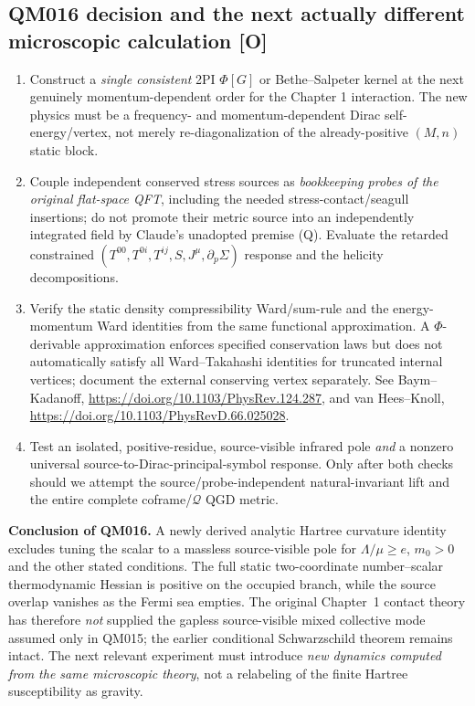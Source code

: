 \documentclass[11pt,a4paper]{article}
\begin{document}
\subsection{QM016 decision and the next actually different microscopic calculation [O]}\label{sec:v10-decision}
\begin{enumerate}[label=\textbf{QM017-\arabic*.},leftmargin=18mm,itemsep=3pt]
\item Construct a \emph{single consistent} 2PI $\Phi[G]$ or Bethe--Salpeter kernel at the next genuinely momentum-dependent order for the Chapter 1 interaction. The new physics must be a frequency- and momentum-dependent Dirac self-energy/vertex, not merely re-diagonalization of the already-positive $(M,n)$ static block.
\item Couple independent conserved stress sources as \emph{bookkeeping probes of the original flat-space QFT}, including the needed stress-contact/seagull insertions; do not promote their metric source into an independently integrated field by Claude's unadopted premise (Q). Evaluate the retarded constrained $(T^{00},T^{0i},T^{ij},S,J^\mu,\partial_p\Sigma)$ response and the helicity decompositions.
\item Verify the static density compressibility Ward/sum-rule and the energy-momentum Ward identities from the same functional approximation. A $\Phi$-derivable approximation enforces specified conservation laws but does not automatically satisfy all Ward--Takahashi identities for truncated internal vertices; document the external conserving vertex separately. See Baym--Kadanoff, \url{https://doi.org/10.1103/PhysRev.124.287}, and van Hees--Knoll, \url{https://doi.org/10.1103/PhysRevD.66.025028}.
\item Test an isolated, positive-residue, source-visible infrared pole \emph{and} a nonzero universal source-to-Dirac-principal-symbol response. Only after both checks should we attempt the source/probe-independent natural-invariant lift and the entire complete coframe/$\mathcal Q$ QGD metric.
\end{enumerate}
\textbf{Conclusion of QM016.} A newly derived analytic Hartree curvature identity excludes tuning the scalar to a massless source-visible pole for $\Lambda/\mu\ge e$, $m_0>0$ and the other stated conditions. The full static two-coordinate number--scalar thermodynamic Hessian is positive on the occupied branch, while the source overlap vanishes as the Fermi sea empties. The original Chapter~1 contact theory has therefore \emph{not} supplied the gapless source-visible mixed collective mode assumed only in QM015; the earlier conditional Schwarzschild theorem remains intact. The next relevant experiment must introduce \emph{new dynamics computed from the same microscopic theory}, not a relabeling of the finite Hartree susceptibility as gravity.
\end{document}
